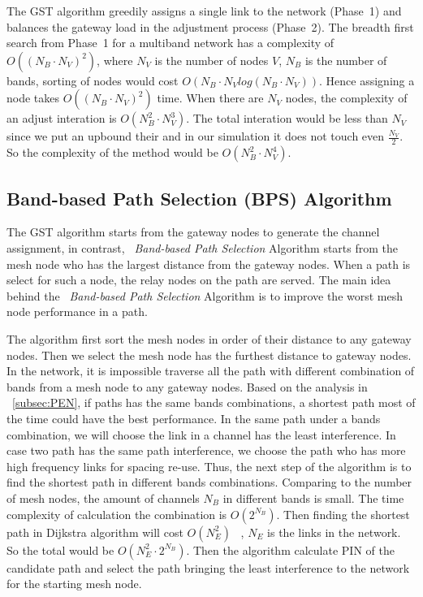 The GST algorithm greedily assigns a single link to the network (Phase~1) 
and balances the gateway load in the adjustment process (Phase~2). 
The breadth first search from Phase~1 for a multiband network has a complexity 
of $O((N_B \cdot N_V)^2)$, where $N_V$ is the number of nodes $V$, $N_B$ is the number of bands, 
sorting of nodes would cost $O(N_B \cdot N_V log(N_B \cdot N_V))$. 
Hence assigning a node takes $O((N_B \cdot N_V)^2)$ time. When there are $N_V$ nodes, the complexity of an adjust interation is $O(N_B^2 \cdot N_V^3)$.
The total interation would be less than $N_V$ since we put an upbound their and in our simulation it does not touch even $\frac{N_V}{2}$. So the complexity of the method would be $O(N_B^2 \cdot N_V^4)$.

\subsection{Band-based Path Selection (BPS) Algorithm}
\label{subsec:step}

The GST algorithm starts from the gateway nodes to generate the channel assignment, in contrast, ~\emph{Band-based Path Selection} Algorithm starts from the mesh node who has the largest distance from the gateway nodes.
When a path is select for such a node, the relay nodes on the path are served. 
The main idea behind the ~\emph{Band-based Path Selection} Algorithm is to improve the worst mesh node performance in a path. 

The algorithm first sort the mesh nodes in order of their distance to any gateway nodes. Then we select the mesh node has the furthest distance to gateway nodes. In the network, it is impossible traverse all the path with different combination of bands from a mesh node to any gateway nodes. Based on the analysis in ~\ref{subsec:PEN}, if paths has the same bands combinations, a shortest path most of the time could have the best performance.
In the same path under a bands combination, we will choose the link in a channel has the least interference.
 In case two path has the same path interference, we choose the path who has more high frequency links for spacing re-use.
Thus, the next step of the algorithm is to find the shortest path in different bands combinations. Comparing to the number of mesh nodes, the amount of channels $N_B$ in different bands is small. The time complexity of calculation the combination is $O(2^{N_B})$. 
Then finding the shortest path in Dijkstra algorithm will cost $O(N_E^2)$ ~\cite{golden1976shortest}, $N_E$ is the links in the network. So the total would be $O(N_E^2\cdot 2^{N_B})$.
Then the algorithm calculate PIN of the candidate path and select the path bringing the least interference to the network for the starting mesh node.


